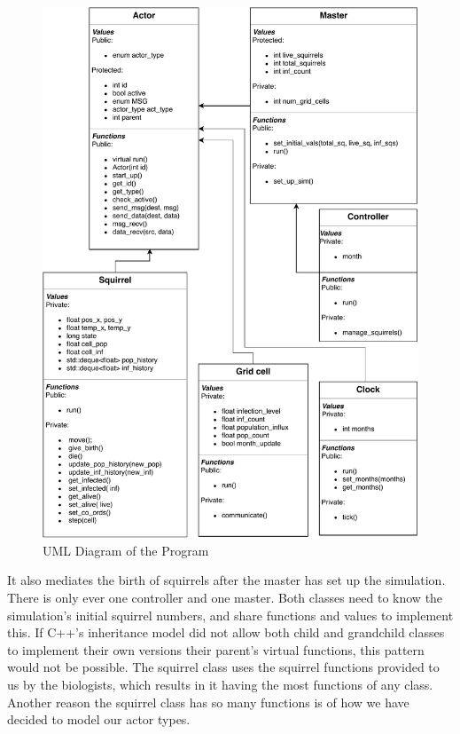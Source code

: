 \documentclass[oneside]{article}
\begin{document}
\begin{figure}[H]
  \includegraphics[width=\linewidth]{figures/pdp_uml}
  \caption{UML Diagram of the Program}
  \label{fig:uml}
\end{figure}
It also mediates the birth of squirrels after the master has set up the simulation. There is only ever one controller and one master. Both classes need to know the simulation's initial squirrel numbers, and share functions and values to implement this. If C++'s inheritance model did not allow both child and grandchild classes to implement their own versions their parent's virtual functions, this pattern would not be possible. The squirrel class uses the squirrel functions provided to us by the biologists, which results in it having the most functions of any class. Another reason the squirrel class has so many functions is of how we have decided to model our actor types.
\end{document}
